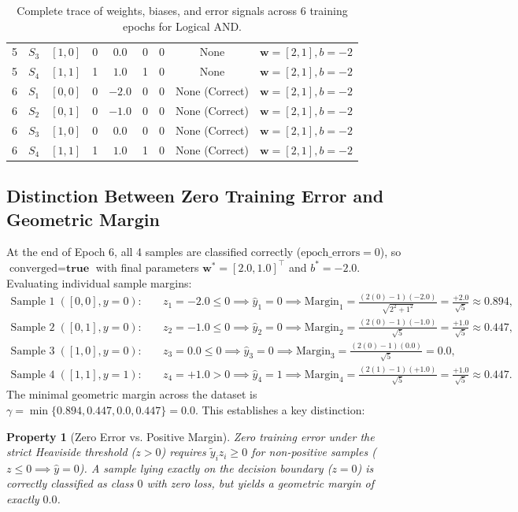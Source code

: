 \documentclass[11pt]{article}
\newtheorem{property}{Property}
\begin{document}
\begin{table}[H]
\begin{tabular}{ccccccccl}
5 & $S_3$ & $[1, 0]$ & 0 & $0.0$ & 0 & 0 & None & $\mathbf{w}=[2, 1], b=-2$ \\
5 & $S_4$ & $[1, 1]$ & 1 & $1.0$ & 1 & 0 & None & $\mathbf{w}=[2, 1], b=-2$ \\
\midrule
6 & $S_1$ & $[0, 0]$ & 0 & $-2.0$ & 0 & 0 & None (Correct) & $\mathbf{w}=[2, 1], b=-2$ \\
6 & $S_2$ & $[0, 1]$ & 0 & $-1.0$ & 0 & 0 & None (Correct) & $\mathbf{w}=[2, 1], b=-2$ \\
6 & $S_3$ & $[1, 0]$ & 0 & $0.0$ & 0 & 0 & None (Correct) & $\mathbf{w}=[2, 1], b=-2$ \\
6 & $S_4$ & $[1, 1]$ & 1 & $1.0$ & 1 & 0 & None (Correct) & $\mathbf{w}=[2, 1], b=-2$ \\
\bottomrule
\end{tabular}
\caption{Complete trace of weights, biases, and error signals across 6 training epochs for Logical AND.}
\label{tab:and_trace}
\end{table}

\subsection{Distinction Between Zero Training Error and Geometric Margin}
At the end of Epoch 6, all 4 samples are classified correctly ($\text{epoch\_errors} = 0$), so $\text{converged} = \textbf{true}$ with final parameters $\mathbf{w}^* = [2.0, 1.0]^\top$ and $b^* = -2.0$.
Evaluating individual sample margins:
\begin{align}
\text{Sample } 1 \; ([0, 0], y=0): & \quad z_1 = -2.0 \le 0 \implies \hat{y}_1 = 0 \implies \text{Margin}_1 = \frac{(2(0)-1)(-2.0)}{\sqrt{2^2 + 1^2}} = \frac{+2.0}{\sqrt{5}} \approx 0.894, \\
\text{Sample } 2 \; ([0, 1], y=0): & \quad z_2 = -1.0 \le 0 \implies \hat{y}_2 = 0 \implies \text{Margin}_2 = \frac{(2(0)-1)(-1.0)}{\sqrt{5}} = \frac{+1.0}{\sqrt{5}} \approx 0.447, \\
\text{Sample } 3 \; ([1, 0], y=0): & \quad z_3 = 0.0 \le 0 \implies \hat{y}_3 = 0 \implies \text{Margin}_3 = \frac{(2(0)-1)(0.0)}{\sqrt{5}} = 0.0, \\
\text{Sample } 4 \; ([1, 1], y=1): & \quad z_4 = +1.0 > 0 \implies \hat{y}_4 = 1 \implies \text{Margin}_4 = \frac{(2(1)-1)(+1.0)}{\sqrt{5}} = \frac{+1.0}{\sqrt{5}} \approx 0.447.
\end{align}
The minimal geometric margin across the dataset is $\gamma = \min \{0.894, 0.447, 0.0, 0.447\} = 0.0$.
This establishes a key distinction:
\begin{property}[Zero Error vs. Positive Margin]
Zero training error under the strict Heaviside threshold ($z > 0$) requires $\tilde{y}_i z_i \ge 0$ for non-positive samples ($z \le 0 \implies \hat{y}=0$). A sample lying exactly on the decision boundary ($z=0$) is correctly classified as class $0$ with zero loss, but yields a geometric margin of exactly $0.0$.
\end{property}
\end{document}
